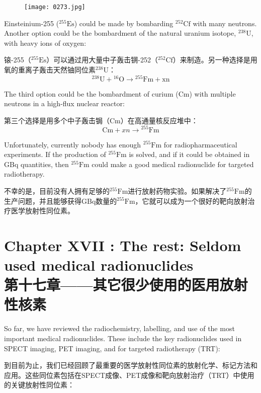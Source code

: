 \documentclass[dvipsnames, svgnames,a4paper,11pt]{article}
\begin{document}
\begin{figure}[h]
	\centering
    \texttt{[image: 0273.jpg]}  
     \label{fig370}
\end{figure}

Einsteinium-255 (\(\mathrm{^{255}Es}\)) could be made by bombarding \(\mathrm{^{252}Cf}\) with many neutrons. Another option could be the bombardment of the natural uranium isotope, \(\mathrm{^{238}U}\), with heavy ions of oxygen:  



锿-255（\(\mathrm{^{255}Es}\)）可以通过用大量中子轰击锎-252（\(\mathrm{^{252}Cf}\)）来制造。另一种选择是用氧的重离子轰击天然铀同位素\(\mathrm{^{238}U}\)：  
\[
\mathrm{^{238}U + {}^{16}O \to {}^{255}Fm + xn}
\]

The third option could be the bombardment of curium (\(\mathrm{Cm}\)) with multiple neutrons in a high-flux nuclear reactor:  

第三个选择是用多个中子轰击锔（\(\mathrm{Cm}\)）在高通量核反应堆中：  
\[
\mathrm{Cm} + xn \to \mathrm{{}^{255}Fm}
\]

Unfortunately, currently nobody has enough \(\mathrm{^{255}Fm}\) for radiopharmaceutical experiments. If the production of \(\mathrm{^{255}Fm}\) is solved, and if it could be obtained in GBq quantities, then \(\mathrm{^{255}Fm}\) could make a good medical radionuclide for targeted radiotherapy.

不幸的是，目前没有人拥有足够的\(\mathrm{^{255}Fm}\)进行放射药物实验。如果解决了\(\mathrm{^{255}Fm}\)的生产问题，并且能够获得GBq数量的\(\mathrm{^{255}Fm}\)，它就可以成为一个很好的靶向放射治疗医学放射性同位素。

\newpage




\section{Chapter XVII :  The rest: Seldom used medical radionuclides\\第十七章——其它很少使用的医用放射性核素}

So far, we have reviewed the radiochemistry, labelling, and use of the most important medical radionuclides. These include the key radionuclides used in SPECT imaging, PET imaging, and for targeted radiotherapy (TRT):

到目前为止，我们已经回顾了最重要的医学放射性同位素的放射化学、标记方法和应用。这些同位素包括在SPECT成像、PET成像和靶向放射治疗（TRT）中使用的关键放射性同位素：
\end{document}
